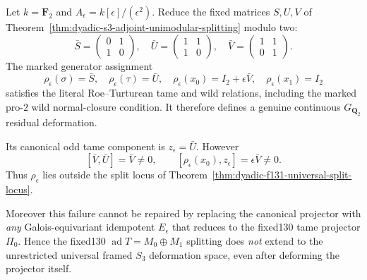 \begin{theorem}
\label{thm:dyadic-f131-first-order-nosplit}
Let
$k=\mathbf F_2$ and
$A_\epsilon=k[\epsilon]/(\epsilon^2)$.
Reduce the fixed matrices
$S,U,V$ of
Theorem~\ref{thm:dyadic-s3-adjoint-unimodular-splitting}
modulo two:
\begin{equation}\label{eq:dyadic-f131-wild-counterexample-matrices}
\bar S=
\begin{pmatrix}0&1\\1&0\end{pmatrix},
\quad
\bar U=
\begin{pmatrix}1&1\\1&0\end{pmatrix},
\quad
\bar V=
\begin{pmatrix}1&1\\0&1\end{pmatrix}.
\end{equation}
The marked generator assignment
\begin{equation}\label{eq:dyadic-f131-wild-counterexample-rep}
\boxed{\quad
\rho_\epsilon(\sigma)=\bar S,\quad
\rho_\epsilon(\tau)=\bar U,\quad
\rho_\epsilon(x_0)=I_2+\epsilon\bar V,\quad
\rho_\epsilon(x_1)=I_2
\quad}
\end{equation}
satisfies the literal
Roe--Turturean tame and
wild relations, including
the marked pro-$2$ wild
normal-closure condition.
It therefore defines a
genuine continuous
$G_{\mathbf Q_2}$ residual
deformation.

Its canonical odd tame
component is
$z_\epsilon=\bar U$.
However
\begin{equation}\label{eq:dyadic-f131-nonzero-wild-commutator}
\boxed{\quad
[\bar V,\bar U]=\bar V\ne0,\qquad
[\rho_\epsilon(x_0),z_\epsilon]
=\epsilon\bar V\ne0.
\quad}
\end{equation}
Thus $\rho_\epsilon$ lies
outside the split locus of
Theorem~\ref{thm:dyadic-f131-universal-split-locus}.

Moreover this failure
cannot be repaired by
replacing the canonical
projector with \emph{any}
Galois-equivariant
idempotent
$E_\epsilon$ that reduces
to the fixed130 tame
projector $\Pi_0$.
Hence the fixed130
$\operatorname{ad}T=M_0\oplus M_1$
splitting does \emph{not}
extend to the unrestricted
universal framed
$S_3$ deformation space,
even after deforming the
projector itself.
\end{theorem}

